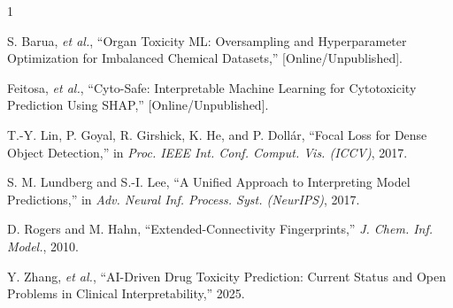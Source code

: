 \documentclass[lettersize,journal]{IEEEtran}
\begin{document}
\begin{thebibliography}{1}


S. Barua, \textit{et al.}, ``Organ Toxicity ML: Oversampling and Hyperparameter Optimization for Imbalanced Chemical Datasets,'' [Online/Unpublished].

Feitosa, \textit{et al.}, ``Cyto-Safe: Interpretable Machine Learning for Cytotoxicity Prediction Using SHAP,'' [Online/Unpublished].

T.-Y. Lin, P. Goyal, R. Girshick, K. He, and P. Dollár, ``Focal Loss for Dense Object Detection,'' in \textit{Proc. IEEE Int. Conf. Comput. Vis. (ICCV)}, 2017.

S. M. Lundberg and S.-I. Lee, ``A Unified Approach to Interpreting Model Predictions,'' in \textit{Adv. Neural Inf. Process. Syst. (NeurIPS)}, 2017.

D. Rogers and M. Hahn, ``Extended-Connectivity Fingerprints,'' \textit{J. Chem. Inf. Model.}, 2010.

Y. Zhang, \textit{et al.}, ``AI-Driven Drug Toxicity Prediction: Current Status and Open Problems in Clinical Interpretability,'' 2025.

\end{thebibliography}
\end{document}

